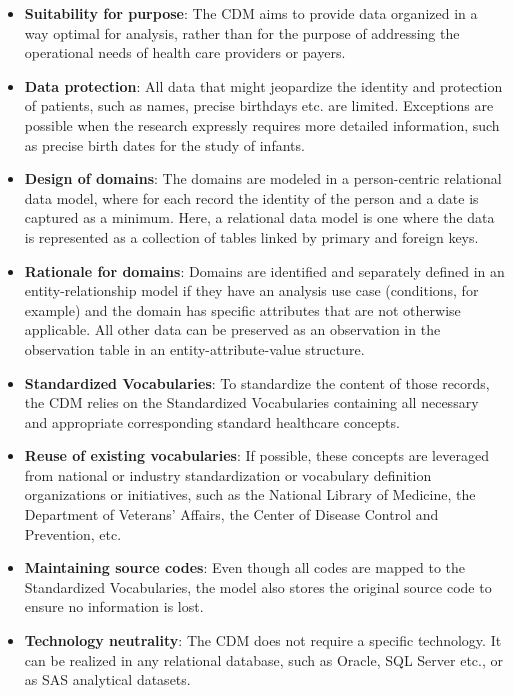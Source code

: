 \documentclass[11pt]{book}
\providecommand{\tightlist}{%
  \setlength{\itemsep}{0pt}\setlength{\parskip}{0pt}}
\theoremstyle{definition}
\theoremstyle{definition}
\theoremstyle{definition}
\theoremstyle{remark}
\begin{document}
\begin{itemize}
\tightlist
\item
  \textbf{Suitability for purpose}: The CDM aims to provide data organized in a way optimal for analysis, rather than for the purpose of addressing the operational needs of health care providers or payers. 
\item
  \textbf{Data protection}: All data that might jeopardize the identity and protection of patients, such as names, precise birthdays etc. are limited. Exceptions are possible when the research expressly requires more detailed information, such as precise birth dates for the study of infants.
\item
  \textbf{Design of domains}: The domains are modeled in a person-centric relational data model, where for each record the identity of the person and a date is captured as a minimum. Here, a relational data model is one where the data is represented as a collection of tables linked by primary and foreign keys.
\item
  \textbf{Rationale for domains}: Domains are identified and separately defined in an entity-relationship model if they have an analysis use case (conditions, for example) and the domain has specific attributes that are not otherwise applicable. All other data can be preserved as an observation in the observation table in an entity-attribute-value structure. 
\item
  \textbf{Standardized Vocabularies}: To standardize the content of those records, the CDM relies on the Standardized Vocabularies containing all necessary and appropriate corresponding standard healthcare concepts.
\item
  \textbf{Reuse of existing vocabularies}: If possible, these concepts are leveraged from national or industry standardization or vocabulary definition organizations or initiatives, such as the National Library of Medicine, the Department of Veterans' Affairs, the Center of Disease Control and Prevention, etc.
\item
  \textbf{Maintaining source codes}: Even though all codes are mapped to the Standardized Vocabularies, the model also stores the original source code to ensure no information is lost.  
\item
  \textbf{Technology neutrality}: The CDM does not require a specific technology. It can be realized in any relational database, such as Oracle, SQL Server etc., or as SAS analytical datasets.

\end{itemize}
\end{document}
